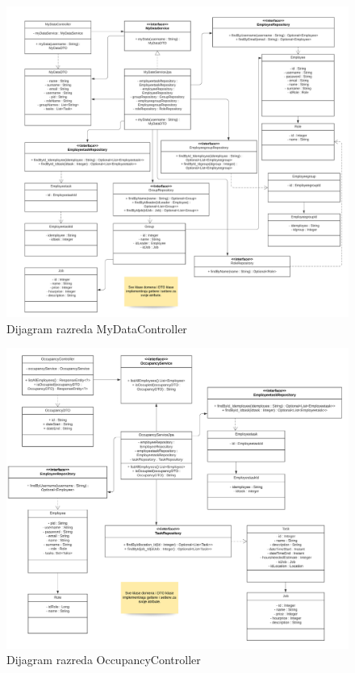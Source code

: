 			
			\eject
			\begin{figure}[H]
					\centering
					\includegraphics[width=\textwidth]{slike/fixMyDataController.jpg}
					\caption{Dijagram razreda MyDataController}
				\end{figure}
			
			
			\eject
			\begin{figure}[H]
					\centering
					\includegraphics[width=\textwidth]{slike/fixOccupancyController.jpg}
					\caption{Dijagram razreda OccupancyController}
				\end{figure}
			
